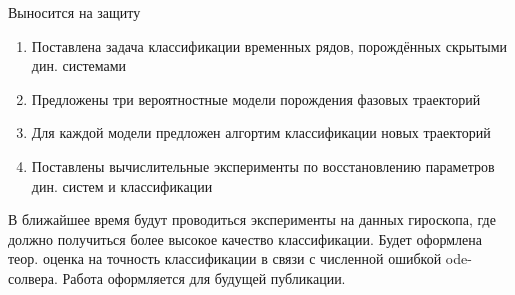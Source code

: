 \documentclass[10pt]{beamer}
\theoremstyle{definition}
\begin{document}
	\begin{frame}{Выносится на защиту}
		
		\begin{enumerate}
			\item Поставлена задача классификации временных рядов, порождённых скрытыми дин. системами
			\item Предложены три вероятностные модели порождения фазовых траекторий
			\item Для каждой модели предложен алгортим классификации новых траекторий
			\item Поставлены вычислительные эксперименты по восстановлению параметров дин. систем и классификации 
		\end{enumerate}
		
		В ближайшее время будут проводиться эксперименты на данных гироскопа, где должно получиться более высокое качество классификации. Будет оформлена теор. оценка на точность классификации в связи с численной ошибкой  ode-солвера. Работа оформляется для будущей публикации.
		
	\end{frame}	
	
\end{document}
